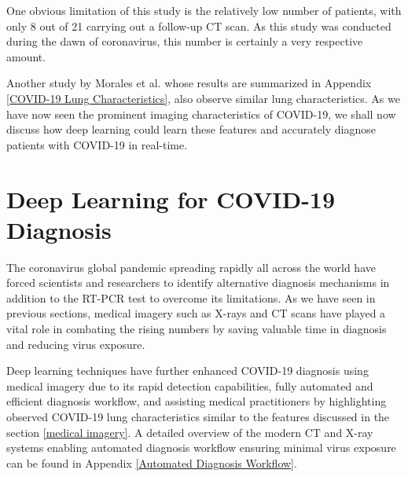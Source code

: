 
\vspace{-2em}
One obvious limitation of this study is the relatively low number of 
patients, with only 8 out of 21 carrying out a follow-up CT scan. As this study
was conducted during the dawn of coronavirus, this number is certainly a 
very respective amount.

Another study by Morales et al. whose results are summarized in Appendix \ref{COVID-19 Lung Characteristics}, also observe similar lung characteristics. As we have now seen the prominent imaging characteristics of 
COVID-19, we shall now discuss how deep learning could learn these 
features and accurately diagnose patients with COVID-19 in real-time. 

\section{Deep Learning for COVID-19 Diagnosis}

The coronavirus global pandemic spreading rapidly all across the world have 
forced scientists and researchers to identify alternative 
diagnosis mechanisms in addition to the RT-PCR test to overcome 
its limitations. As we have seen in previous sections, 
medical imagery such as X-rays and CT scans have played a 
vital role in combating the rising numbers by saving 
valuable time in diagnosis and reducing virus exposure.

Deep learning techniques have further enhanced COVID-19 diagnosis 
using medical imagery due to its rapid detection capabilities, 
fully automated and efficient diagnosis workflow, 
and assisting medical practitioners by highlighting observed 
COVID-19 lung characteristics similar to the 
features discussed in the section \ref{medical imagery}. A detailed overview of the modern CT and X-ray systems enabling automated diagnosis workflow ensuring minimal virus exposure can be found in Appendix \ref{Automated Diagnosis Workflow}.

